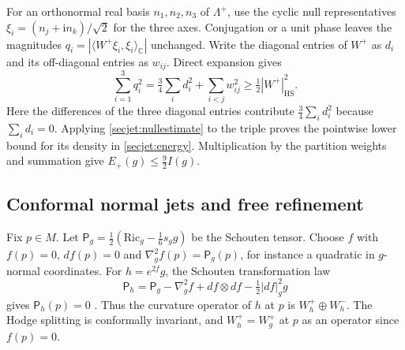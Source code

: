 \documentclass[11pt]{article}
\numberwithin{equation}{section}
\theoremstyle{definition}
\theoremstyle{remark}
\begin{document}
For an orthonormal real basis \(n_1,n_2,n_3\) of \(\Lambda^+\),
use the cyclic null representatives
\(\xi_i=(n_j+\mathrm i n_k)/\sqrt2\) for the three axes.
Conjugation or a unit phase leaves the magnitudes
\(q_i=|\langle W^+\xi_i,\xi_i\rangle_{\mathbb C}|\) unchanged.
Write the diagonal entries of \(W^+\) as \(d_i\) and its off-diagonal
entries as \(w_{ij}\). Direct expansion gives
\begin{equation}
 \label{secjet:orthogonal}
 \sum_{i=1}^3 q_i^2=\tfrac34\sum_i d_i^2+\sum_{i<j}w_{ij}^2
       \ge \tfrac12 |W^+|_{\mathrm{HS}}^2 .
\end{equation}
Here the differences of the three diagonal entries contribute
\(\tfrac34\sum_i d_i^2\) because \(\sum_i d_i=0\).
Applying \eqref{secjet:nullestimate} to the triple proves the pointwise
lower bound for its density in \eqref{secjet:energy}. Multiplication by
the partition weights and summation give
\(E_+(g)\le \tfrac92 I(g)\).

\subsection{Conformal normal jets and free refinement}

Fix \(p\in M\). Let \(\mathsf P_g=\tfrac12(\mathrm{Ric}_g-\tfrac16s_g g)\)
be the Schouten tensor. Choose \(f\) with \(f(p)=0\), \(df(p)=0\)
and \(\nabla_g^2 f(p)=\mathsf P_g(p)\), for instance a quadratic
in \(g\)-normal coordinates. For \(h=e^{2f}g\), the Schouten
transformation law
\[
 \mathsf P_h=\mathsf P_g-\nabla_g^2 f+df\otimes df-\tfrac12|df|_g^2g
\]
gives \(\mathsf P_h(p)=0\) \cite[(6.7) and proof of Proposition 8.4]{FeffermanGraham2008Ambient}.
Thus the curvature operator of \(h\) at \(p\) is \(W_h^+\oplus W_h^-\).
The Hodge splitting is conformally invariant, and \(W_h^+=W_g^+\)
at \(p\) as an operator since \(f(p)=0\).
\end{document}

